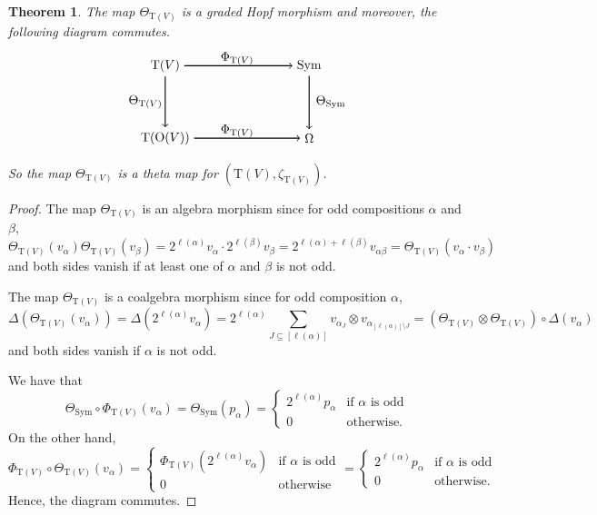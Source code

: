 \documentclass[12pt]{amsart}
\newtheorem{theorem}{Theorem}[section]
\numberwithin{equation}{section}
\newcommand{\Sym}{\mathrm{Sym}}
\newcommand{\rmO}{\mathrm{O}}
\newcommand{\rmT}{\mathrm{T}}
\begin{document}
\begin{theorem}\label{thm:odd-tensor}
	The map $\Theta_{\rmT(V)}$ is a graded Hopf morphism and moreover, the following diagram commutes. 
	$$
	\begin{tikzpicture}
	\node(TV) at (0,0){$\rmT(V)$};
	\node(Sym) at (4,0){$\Sym$};
	\node(OV) at (0,-2){$\rmT(\rmO(V))$};
	\node(Omega) at (4,-2){$\Omega$};
	
	\draw[thick,->]  (TV)->(Sym);
	\draw[thick,->]  (OV)->(Omega);
	\draw[thick,->]   (TV)->(OV);
	\draw[thick,->]   (Sym)->(Omega);
	
	\node(Phi) at (2,0.2){$\Phi_{\rmT(V)}$};
	\node(Phi) at (2,-1.8){$\Phi_{\rmT(V)}$};
	\node(thetaV) at (-0.55,-1){$\Theta_{\rmT(V)}$};
	\node(thetaV) at (4.6,-1){$\Theta_\Sym$};
	\end{tikzpicture} 
	$$
	So the map $\Theta_{\rmT(V)}$ is a theta map for $(\rmT(V),\zeta_{\rmT(V)})$.
\end{theorem} 

\begin{proof}
	The map $\Theta_{\rmT(V)}$ is an algebra morphism since for odd compositions $\alpha$ and $\beta$,
	$$\Theta_{\rmT(V)}(v_\alpha)\Theta_{\rmT(V)}(v_\beta)=2^{\ell(\alpha)}v_\alpha\cdot2^{\ell(\beta)} v_\beta=2^{\ell(\alpha)+\ell(\beta)}v_{\alpha\beta}=\Theta_{\rmT(V)}(v_\alpha\cdot v_\beta)$$
	and both sides vanish if at least one of $\alpha$ and $\beta$ is not odd.
	
	The map $\Theta_{\rmT(V)}$ is a coalgebra morphism since for odd composition $\alpha$,
	$$\Delta(\Theta_{\rmT(V)}(v_\alpha))=\Delta\left(2^{\ell(\alpha)}v_\alpha\right)=2^{\ell(\alpha)}\sum_{J\subseteq[\ell(\alpha)]}v_{\alpha_J}\otimes v_{\alpha_{[\ell(\alpha)]\setminus J}}=\left(\Theta_{\rmT(V)}\otimes\Theta_{\rmT(V)}\right)\circ\Delta(v_\alpha)$$
	and both sides vanish if $\alpha$ is not odd.
	
	We have that
	$$\Theta_\Sym\circ \Phi_{\rmT(V)}(v_\alpha)=\Theta_\Sym(p_\alpha)=\left\{\begin{array}{cc}
	2^{\ell(\alpha)}p_\alpha & \text{if }\alpha \text{ is odd}\\
	0& \text{otherwise.}
	\end{array}\right.$$
	On the other hand,
	$$\Phi_{\rmT(V)}\circ\Theta_{\rmT(V)}(v_\alpha)=\left\{\begin{array}{cc}
	\Phi_{\rmT(V)}\left(2^{\ell(\alpha)}v_\alpha\right) & \text{if }\alpha \text{ is odd}\\
	0& \text{otherwise}
	\end{array}\right.=\left\{\begin{array}{cc}
	2^{\ell(\alpha)}p_\alpha & \text{if }\alpha \text{ is odd}\\
	0& \text{otherwise.}
	\end{array}\right.$$
	Hence, the diagram commutes.
\end{proof}
\end{document}
